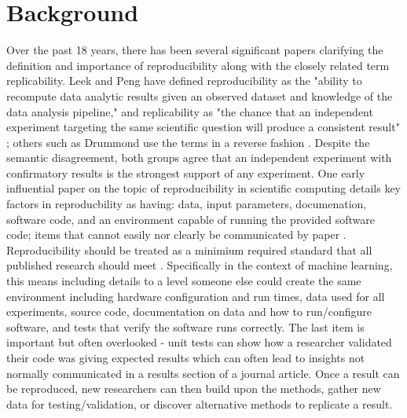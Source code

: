 \documentclass{article}
\begin{document}
\section{Background}

Over the past 18 years, there has been several significant papers clarifying the definition and importance of reproducibility along with the closely related term replicability. Leek and Peng have defined reproducibility as the "ability to recompute data analytic results given an observed dataset and knowledge of the data analysis pipeline," and replicability as "the chance that an independent experiment targeting the same scientific question will produce a consistent result" \cite{leek_opinion_2015}; others such as Drummond use the terms in a reverse fashion \cite{drummond_replicability_2009}. Despite the semantic disagreement, both groups agree that an independent experiment with confirmatory results is the strongest support of any experiment. One early influential paper on the topic of reproducibility in scientific computing details key factors in reproducbility as having: data, input parameters, documenation, software code, and an environment capable of running the provided software code; items that cannot easily nor clearly be communicated by paper \cite{schwab_making_2000}. Reproducibility should be treated as a minimium required standard that all published research should meet \cite{peng_reproducible_2006}. Specifically in the context of machine learning, this means including details to a level someone else could create the same environment including hardware configuration and run times, data used for all experiments, source code, documentation on data and how to run/configure software, and tests that verify the software runs correctly. The last item is important but often overlooked - unit tests can show how a researcher validated their code was giving expected results which can often lead to insights not normally communicated in a results section of a journal article. Once a result can be reproduced, new researchers can then build upon the methods, gather new data for testing/validation, or discover alternative methods to replicate a result.
\end{document}
